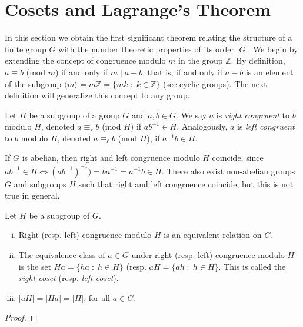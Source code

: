 \documentclass[../main.tex]{subfiles}
\begin{document}
\section{Cosets and Lagrange's Theorem}
In this section we obtain the first significant theorem relating the structure of a finite group $G$ with the number theoretic properties of its order $|G|$. We begin by extending the concept of congruence modulo $m$ in the group $\mathbb{Z}$. By definition, $a\equiv b$ (mod $m$) if and only if $m\mid a-b$, that is, if and only if $a-b$ is an element of the subgroup $\langle m\rangle = m\mathbb{Z} = \{mk\;:\;k\in\mathbb{Z}\}$ (see cyclic groups). The next definition will generalize this concept to any group.

\begin{defi}
[Congruent] Let $H$ be a subgroup of a group $G$ and $a,b\in G$. We say $a$ is \textit{right congruent} to $b$ modulo $H$, denoted $a\equiv_r b$ (mod $H$) if $ab^{-1}\in H$. Analogously, $a$ is \textit{left congruent} to $b$ modulo $H$, denoted $a\equiv_\ell b$ (mod $H$), if $a^{-1}b\in H$.
\end{defi}

\begin{nota}
If $G$ is abelian, then right and left congruence modulo $H$ coincide, since $ab^{-1}\in H\Leftrightarrow (ab^{-1})^{-1}) = ba^{-1} = a^{-1}b\in H$. There also exist non-abelian groups $G$ and subgroups $H$ such that right and left congruence coincide, but this is not true in general.
\end{nota}

\begin{ter}
\label{ter:congruenceclasses} Let $H$ be a subgroup of $G$.
\begin{enumerate}[(i)]
    \item Right (resp. left) congruence modulo $H$ is an equivalent relation on $G$.
    \item The equivalence class of $a\in G$ under right (resp. left) congruence modulo $H$ is the set $Ha = \{ha\;:\;h\in H\}$ (resp. $aH = \{ah\;:\;h\in H\}$. This is called the \textit{right coset} (resp. \textit{left coset}).
    \item $|aH| = |Ha| = |H|$, for all $a\in G$.
\end{enumerate}
\end{ter}
\begin{proof}
\noproof
\end{proof}
\end{document}
